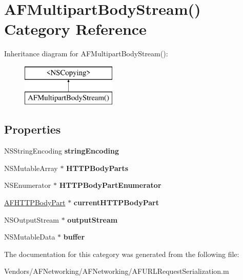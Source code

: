 \hypertarget{category_a_f_multipart_body_stream_07_08}{}\section{A\+F\+Multipart\+Body\+Stream() Category Reference}
\label{category_a_f_multipart_body_stream_07_08}
Inheritance diagram for A\+F\+Multipart\+Body\+Stream()\+:\begin{figure}[H]
\begin{center}
\leavevmode
\includegraphics[height=2.000000cm]{category_a_f_multipart_body_stream_07_08}
\end{center}
\end{figure}
\subsection*{Properties}
\begin{DoxyCompactItemize}
\item 
\hypertarget{category_a_f_multipart_body_stream_07_08_a24375ab1dd4d3576eff24e5c9346c83c}{}N\+S\+String\+Encoding {\bfseries string\+Encoding}\label{category_a_f_multipart_body_stream_07_08_a24375ab1dd4d3576eff24e5c9346c83c}

\item 
\hypertarget{category_a_f_multipart_body_stream_07_08_a167d5df6c437a8a93b46de309d067198}{}N\+S\+Mutable\+Array $\ast$ {\bfseries H\+T\+T\+P\+Body\+Parts}\label{category_a_f_multipart_body_stream_07_08_a167d5df6c437a8a93b46de309d067198}

\item 
\hypertarget{category_a_f_multipart_body_stream_07_08_a2e5468c86b09e6a3cb14b812155f86ea}{}N\+S\+Enumerator $\ast$ {\bfseries H\+T\+T\+P\+Body\+Part\+Enumerator}\label{category_a_f_multipart_body_stream_07_08_a2e5468c86b09e6a3cb14b812155f86ea}

\item 
\hypertarget{category_a_f_multipart_body_stream_07_08_a95852aefe9011210705d91b29c7fa620}{}\hyperlink{interface_a_f_h_t_t_p_body_part}{A\+F\+H\+T\+T\+P\+Body\+Part} $\ast$ {\bfseries current\+H\+T\+T\+P\+Body\+Part}\label{category_a_f_multipart_body_stream_07_08_a95852aefe9011210705d91b29c7fa620}

\item 
\hypertarget{category_a_f_multipart_body_stream_07_08_a28c7caebc644034343559f3a09b6452a}{}N\+S\+Output\+Stream $\ast$ {\bfseries output\+Stream}\label{category_a_f_multipart_body_stream_07_08_a28c7caebc644034343559f3a09b6452a}

\item 
\hypertarget{category_a_f_multipart_body_stream_07_08_aa5694a5a64a23a3d20786e6eb0f50b9b}{}N\+S\+Mutable\+Data $\ast$ {\bfseries buffer}\label{category_a_f_multipart_body_stream_07_08_aa5694a5a64a23a3d20786e6eb0f50b9b}

\end{DoxyCompactItemize}


The documentation for this category was generated from the following file\+:\begin{DoxyCompactItemize}
\item 
Vendors/\+A\+F\+Networking/\+A\+F\+Networking/A\+F\+U\+R\+L\+Request\+Serialization.\+m\end{DoxyCompactItemize}
